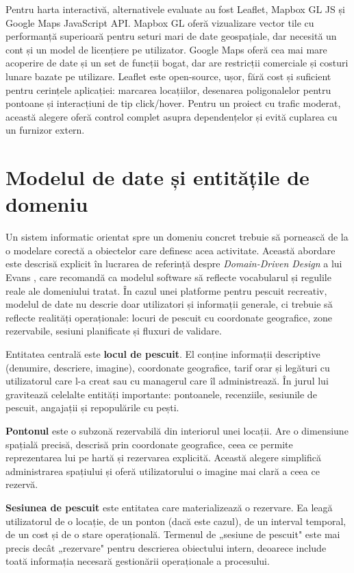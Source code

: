 Pentru harta interactivă, alternativele evaluate au fost Leaflet, Mapbox GL JS și Google Maps JavaScript API. Mapbox GL oferă vizualizare vector tile cu performanță superioară pentru seturi mari de date geospațiale, dar necesită un cont și un model de licențiere pe utilizator. Google Maps oferă cea mai mare acoperire de date și un set de funcții bogat, dar are restricții comerciale și costuri lunare bazate pe utilizare. Leaflet \citep{leaflet} este open-source, ușor, fără cost și suficient pentru cerințele aplicației: marcarea locațiilor, desenarea poligonalelor pentru pontoane și interacțiuni de tip click/hover. Pentru un proiect cu trafic moderat, această alegere oferă control complet asupra dependențelor și evită cuplarea cu un furnizor extern.

\section{Modelul de date și entitățile de domeniu}

Un sistem informatic orientat spre un domeniu concret trebuie să pornească de la o modelare corectă a obiectelor care definesc acea activitate. Această abordare este descrisă explicit în lucrarea de referință despre \emph{Domain-Driven Design} a lui Evans \citep{evans2003}, care recomandă ca modelul software să reflecte vocabularul și regulile reale ale domeniului tratat. În cazul unei platforme pentru pescuit recreativ, modelul de date nu descrie doar utilizatori și informații generale, ci trebuie să reflecte realități operaționale: locuri de pescuit cu coordonate geografice, zone rezervabile, sesiuni planificate și fluxuri de validare.

Entitatea centrală este \textbf{locul de pescuit}. El conține informații descriptive (denumire, descriere, imagine), coordonate geografice, tarif orar și legături cu utilizatorul care l-a creat sau cu managerul care îl administrează. În jurul lui gravitează celelalte entități importante: pontoanele, recenziile, sesiunile de pescuit, angajații și repopulările cu pești.

\textbf{Pontonul} este o subzonă rezervabilă din interiorul unei locații. Are o dimensiune spațială precisă, descrisă prin coordonate geografice, ceea ce permite reprezentarea lui pe hartă și rezervarea explicită. Această alegere simplifică administrarea spațiului și oferă utilizatorului o imagine mai clară a ceea ce rezervă.

\textbf{Sesiunea de pescuit} este entitatea care materializează o rezervare. Ea leagă utilizatorul de o locație, de un ponton (dacă este cazul), de un interval temporal, de un cost și de o stare operațională. Termenul de „sesiune de pescuit" este mai precis decât „rezervare" pentru descrierea obiectului intern, deoarece include toată informația necesară gestionării operaționale a procesului.

